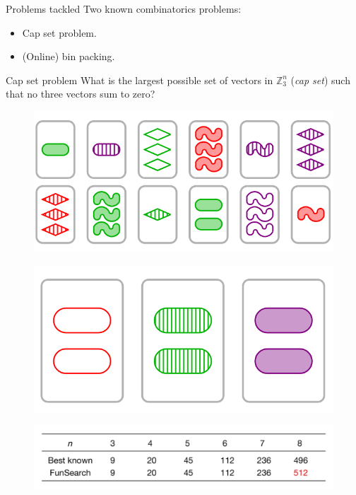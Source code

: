 \documentclass{beamer}
\begin{document}
\begin{frame}{Problems tackled}
Two known combinatorics problems:
\begin{itemize}
\item Cap set problem.
\item (Online) bin packing.
\end{itemize}
\end{frame}

\begin{frame}{Cap set problem}
What is the largest possible set of vectors in $\mathbb{Z}^n_3$
 (\textit{cap set}) such that no three vectors sum to zero?
\pause
\begin{figure}
    \includegraphics[width=0.6\linewidth]{figures/no-set.png}
\end{figure}
    \pause
\begin{figure}
    \includegraphics[width=0.4\linewidth]{figures/set.png}
\end{figure}
\pause
\begin{figure}
\centering
\includegraphics[width=0.7\linewidth]{figures/cup-set-table.png}
\end{figure}
\end{frame}
\end{document}
